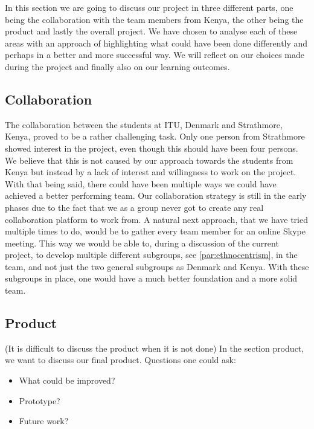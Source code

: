 \label{sec:discussion}
In this section we are going to discuss our project in three different parts, one being the collaboration with the team members from Kenya, the other being the product and lastly the overall project. We have chosen to analyse each of these areas with an approach of highlighting what could have been done differently and perhaps in a better and more successful way. We will reflect on our choices made during the project and finally also on our learning outcomes.

\subsection{Collaboration}\label{subsec:collaboration}
The collaboration between the students at ITU, Denmark and Strathmore, Kenya, proved to be a rather challenging task. Only one person from Strathmore showed interest in the project, even though this should have been four persons. We believe that this is not caused by our approach towards the students from Kenya but instead by a lack of interest and willingness to work on the project.
With that being said, there could have been multiple ways we could have achieved a better performing team. Our collaboration strategy is still in the early phases due to the fact that we as a group never got to create any real collaboration platform to work from. 
A natural next approach, that we have tried multiple times to do, would be to gather every team member for an online Skype meeting. This way we would be able to, during a discussion of the current project, to develop multiple different subgroups, see \ref{par:ethnocentrism}, in the team, and not just the two general subgroups as Denmark and Kenya. With these subgroups in place, one would have a much better foundation and a more solid team.

\subsection{Product}\label{subsec:product}
(It is difficult to discuss the product when it is not done)
In the section product, we want to discuss our final product. Questions one could ask:

\begin{itemize}
	\item What could be improved?
	\item Prototype?
	\item Future work?
\end{itemize}


